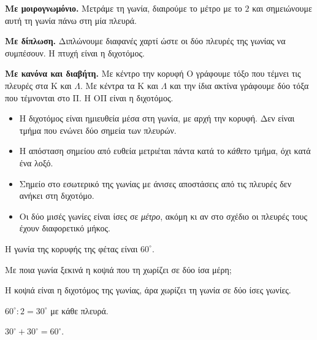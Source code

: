 
\textbf{Με μοιρογνωμόνιο.} Μετράμε τη γωνία, διαιρούμε το μέτρο με το $2$ και σημειώνουμε αυτή τη γωνία πάνω στη μία πλευρά.

\textbf{Με δίπλωση.} Διπλώνουμε διαφανές χαρτί ώστε οι δύο πλευρές της γωνίας να συμπέσουν. Η πτυχή είναι η διχοτόμος.

\textbf{Με κανόνα και διαβήτη.} Με κέντρο την κορυφή $\mathrm{Ο}$ γράφουμε τόξο που τέμνει τις πλευρές στα $\mathrm{Κ}$ και $\Lambda$. Με κέντρα τα $\mathrm{Κ}$ και $\Lambda$ και την ίδια ακτίνα γράφουμε δύο τόξα που τέμνονται στο $\mathrm{Π}$. Η $\mathrm{ΟΠ}$ είναι η διχοτόμος.

\begin{center}
\end{center}

\begin{prosoxi}
\begin{itemize}[leftmargin=1.2em,itemsep=0.3ex,topsep=2pt]
\item Η διχοτόμος είναι ημιευθεία μέσα στη γωνία, με αρχή την κορυφή. Δεν είναι τμήμα που ενώνει δύο σημεία των πλευρών.
\item Η απόσταση σημείου από ευθεία μετριέται πάντα κατά το \emph{κάθετο} τμήμα, όχι κατά ένα λοξό.
\item Σημείο στο εσωτερικό της γωνίας με άνισες αποστάσεις από τις πλευρές δεν ανήκει στη διχοτόμο.
\item Οι δύο μισές γωνίες είναι ίσες σε \emph{μέτρο}, ακόμη κι αν στο σχέδιο οι πλευρές τους έχουν διαφορετικό μήκος.
\end{itemize}
\end{prosoxi}


\tixero Η γωνία της κορυφής της φέτας είναι $60^\circ$.\par
\tithelo Με ποια γωνία ξεκινά η κοψιά που τη χωρίζει σε δύο ίσα μέρη;\par
\possindeo Η κοψιά είναι η διχοτόμος της γωνίας, άρα χωρίζει τη γωνία σε δύο ίσες γωνίες.\par
\apantisi $60^\circ:2=30^\circ$ με κάθε πλευρά.\par
\elegxos $30^\circ+30^\circ=60^\circ$.

